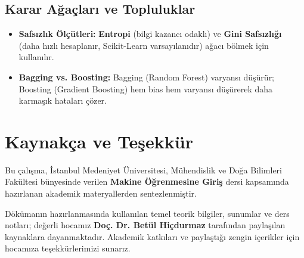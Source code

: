\documentclass[12pt,a4paper]{article}
\begin{document}
\subsection{Karar Ağaçları ve Topluluklar}
\begin{itemize}
    \item \textbf{Safsızlık Ölçütleri:} \textbf{Entropi} (bilgi kazancı odaklı) ve \textbf{Gini Safsızlığı} (daha hızlı hesaplanır, Scikit-Learn varsayılanıdır) ağacı bölmek için kullanılır.
    \item \textbf{Bagging vs. Boosting:} Bagging (Random Forest) varyansı düşürür; Boosting (Gradient Boosting) hem bias hem varyansı düşürerek daha karmaşık hataları çözer.
\end{itemize}

\newpage
\section*{Kaynakça ve Teşekkür}
Bu çalışma, İstanbul Medeniyet Üniversitesi, Mühendislik ve Doğa Bilimleri Fakültesi bünyesinde verilen \textbf{Makine Öğrenmesine Giriş} dersi kapsamında hazırlanan akademik materyallerden sentezlenmiştir.

Dökümanın hazırlanmasında kullanılan temel teorik bilgiler, sunumlar ve ders notları; değerli hocamız \textbf{Doç. Dr. Betül Hiçdurmaz} tarafından paylaşılan kaynaklara dayanmaktadır. Akademik katkıları ve paylaştığı zengin içerikler için hocamıza teşekkürlerimizi sunarız.
\end{document}
